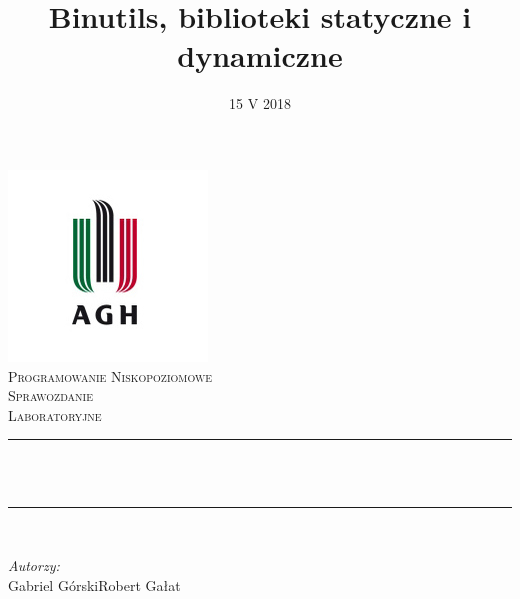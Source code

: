 \documentclass[12pt]{article}
\title{Binutils, biblioteki statyczne i dynamiczne} %
\author{} %
\date{15 V 2018} %
\begin{document}

\begin{titlepage}
  \centering \vspace*{0.5 cm} \includegraphics[scale = 0.75]{agh.jpg}\\[1.0
  cm] %
  \textsc{\Large Programowanie Niskopoziomowe}\\[0.5 cm] %
  \textsc{\large Sprawozdanie\\Laboratoryjne}\\[0.5 cm] %
  \rule{\linewidth}{0.2 mm} \\[0.4 cm]
  { \huge \bfseries \thetitle}\\
  \rule{\linewidth}{0.2 mm} \\[1.5 cm]

  \begin{minipage}{0.4\textwidth}
    \begin{flushleft} \large \vspace{3cm}
      \emph{Autorzy:}\\
      Gabriel Górski\newline Robert Gałat %
    \end{flushleft}
  \end{minipage}~
  \begin{minipage}{0.4\textwidth}
    \begin{flushright} \large
    \end{flushright}
  \end{minipage}\\[2 cm]

  {\large \thedate}\\[2 cm]

  \vfill

\end{titlepage}
\end{document}
